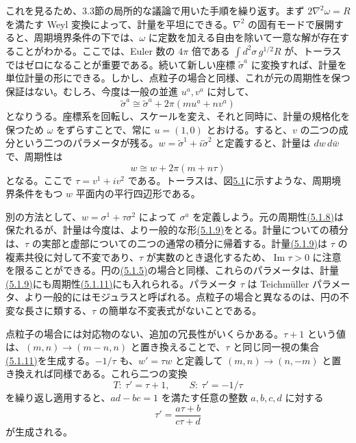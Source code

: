 これを見るため、3.3節の局所的な議論で用いた手順を繰り返す。まず $2\nabla^2\omega=R$ を満たす Weyl 変換によって、計量を平坦にできる。$\nabla^2$ の固有モードで展開すると、周期境界条件の下では、$\omega$ に定数を加える自由を除いて一意な解が存在することがわかる。ここでは、Euler 数の $4\pi$ 倍である $\int d^2\sigma\,g^{1/2}R$ が、トーラスではゼロになることが重要である。続いて新しい座標 $\tilde\sigma^a$ に変換すれば、計量を単位計量の形にできる。しかし、点粒子の場合と同様、これが元の周期性を保つ保証はない。むしろ、今度は一般の並進 $u^a,v^a$ に対して、
\begin{equation}
\tilde\sigma^a\cong\tilde\sigma^a+2\pi(mu^a+nv^a)
\tag{5.1.10}\label{eq:5.1.10}
\end{equation}
となりうる。座標系を回転し、スケールを変え、それと同時に、計量の規格化を保つため $\omega$ をずらすことで、常に $u=(1,0)$ とおける。すると、$v$ の二つの成分という二つのパラメータが残る。$w=\tilde\sigma^1+i\tilde\sigma^2$ と定義すると、計量は $dw\,d\bar w$ で、周期性は
\begin{equation}
w\cong w+2\pi(m+n\tau)
\tag{5.1.11}\label{eq:5.1.11}
\end{equation}
となる。ここで $\tau=v^1+iv^2$ である。トーラスは、図\hyperref[fig:5.1]{5.1}に示すような、周期境界条件をもつ $w$ 平面内の平行四辺形である。

別の方法として、$w=\sigma^1+\tau\sigma^2$ によって $\sigma^a$ を定義しよう。元の周期性\hyperref[eq:5.1.8]{(5.1.8)}は保たれるが、計量は今度は、より一般的な形\hyperref[eq:5.1.9]{(5.1.9)}をとる。計量についての積分は、$\tau$ の実部と虚部についての二つの通常の積分に帰着する。計量\hyperref[eq:5.1.9]{(5.1.9)}は $\tau$ の複素共役に対して不変であり、$\tau$ が実数のとき退化するため、$\operatorname{Im}\tau>0$ に注意を限ることができる。円の\hyperref[eq:5.1.5a]{(5.1.5)}の場合と同様、これらのパラメータは、計量\hyperref[eq:5.1.9]{(5.1.9)}にも周期性\hyperref[eq:5.1.11]{(5.1.11)}にも入れられる。パラメータ $\tau$ は Teichmüller パラメータ、より一般的にはモジュラスと呼ばれる。点粒子の場合と異なるのは、円の不変な長さに類する、$\tau$ の簡単な不変表式がないことである。

点粒子の場合には対応物のない、追加の冗長性がいくらかある。$\tau+1$ という値は、$(m,n)\to(m-n,n)$ と置き換えることで、$\tau$ と同じ同一視の集合\hyperref[eq:5.1.11]{(5.1.11)}を生成する。$-1/\tau$ も、$w'=\tau w$ と定義して $(m,n)\to(n,-m)$ と置き換えれば同様である。これら二つの変換
\begin{equation}
T:\ \tau'=\tau+1,\qquad S:\ \tau'=-1/\tau
\tag{5.1.12}\label{eq:5.1.12}
\end{equation}
を繰り返し適用すると、$ad-bc=1$ を満たす任意の整数 $a,b,c,d$ に対する
\begin{equation}
\tau'=\frac{a\tau+b}{c\tau+d}
\tag{5.1.13}\label{eq:5.1.13}
\end{equation}
が生成される。

